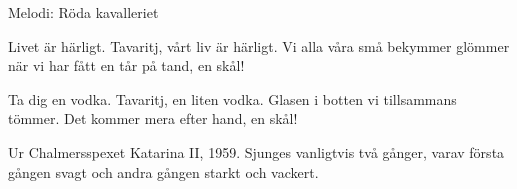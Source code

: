 \begin{song}

\begin{songmeta}
Melodi: Röda kavalleriet
\end{songmeta}

\begin{songtext}
Livet är härligt.
Tavaritj, vårt liv är härligt.
Vi alla våra små bekymmer glömmer
när vi har fått en tår på tand, en skål!

Ta dig en vodka.
Tavaritj, en liten vodka.
Glasen i botten vi tillsammans tömmer.
Det kommer mera efter hand, en skål!
\end{songtext}

\begin{songnotes}
Ur Chalmersspexet Katarina II, 1959.
Sjunges vanligtvis två gånger, varav första gången svagt och andra gången starkt och vackert.
\end{songnotes}
\end{song}

